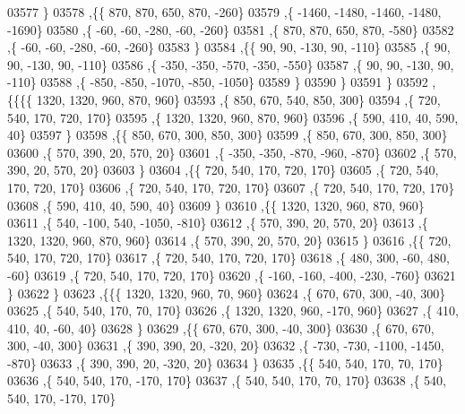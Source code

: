 \begin{DoxyCode}
03577     \}
03578    ,\{\{   870,   870,   650,   870,  -260\}
03579     ,\{ -1460, -1480, -1460, -1480, -1690\}
03580     ,\{   -60,   -60,  -280,   -60,  -260\}
03581     ,\{   870,   870,   650,   870,  -580\}
03582     ,\{   -60,   -60,  -280,   -60,  -260\}
03583     \}
03584    ,\{\{    90,    90,  -130,    90,  -110\}
03585     ,\{    90,    90,  -130,    90,  -110\}
03586     ,\{  -350,  -350,  -570,  -350,  -550\}
03587     ,\{    90,    90,  -130,    90,  -110\}
03588     ,\{  -850,  -850, -1070,  -850, -1050\}
03589     \}
03590    \}
03591   \}
03592  ,\{\{\{\{  1320,  1320,   960,   870,   960\}
03593     ,\{   850,   670,   540,   850,   300\}
03594     ,\{   720,   540,   170,   720,   170\}
03595     ,\{  1320,  1320,   960,   870,   960\}
03596     ,\{   590,   410,    40,   590,    40\}
03597     \}
03598    ,\{\{   850,   670,   300,   850,   300\}
03599     ,\{   850,   670,   300,   850,   300\}
03600     ,\{   570,   390,    20,   570,    20\}
03601     ,\{  -350,  -350,  -870,  -960,  -870\}
03602     ,\{   570,   390,    20,   570,    20\}
03603     \}
03604    ,\{\{   720,   540,   170,   720,   170\}
03605     ,\{   720,   540,   170,   720,   170\}
03606     ,\{   720,   540,   170,   720,   170\}
03607     ,\{   720,   540,   170,   720,   170\}
03608     ,\{   590,   410,    40,   590,    40\}
03609     \}
03610    ,\{\{  1320,  1320,   960,   870,   960\}
03611     ,\{   540,  -100,   540, -1050,  -810\}
03612     ,\{   570,   390,    20,   570,    20\}
03613     ,\{  1320,  1320,   960,   870,   960\}
03614     ,\{   570,   390,    20,   570,    20\}
03615     \}
03616    ,\{\{   720,   540,   170,   720,   170\}
03617     ,\{   720,   540,   170,   720,   170\}
03618     ,\{   480,   300,   -60,   480,   -60\}
03619     ,\{   720,   540,   170,   720,   170\}
03620     ,\{  -160,  -160,  -400,  -230,  -760\}
03621     \}
03622    \}
03623   ,\{\{\{  1320,  1320,   960,    70,   960\}
03624     ,\{   670,   670,   300,   -40,   300\}
03625     ,\{   540,   540,   170,    70,   170\}
03626     ,\{  1320,  1320,   960,  -170,   960\}
03627     ,\{   410,   410,    40,   -60,    40\}
03628     \}
03629    ,\{\{   670,   670,   300,   -40,   300\}
03630     ,\{   670,   670,   300,   -40,   300\}
03631     ,\{   390,   390,    20,  -320,    20\}
03632     ,\{  -730,  -730, -1100, -1450,  -870\}
03633     ,\{   390,   390,    20,  -320,    20\}
03634     \}
03635    ,\{\{   540,   540,   170,    70,   170\}
03636     ,\{   540,   540,   170,  -170,   170\}
03637     ,\{   540,   540,   170,    70,   170\}
03638     ,\{   540,   540,   170,  -170,   170\}

\end{DoxyCode}
